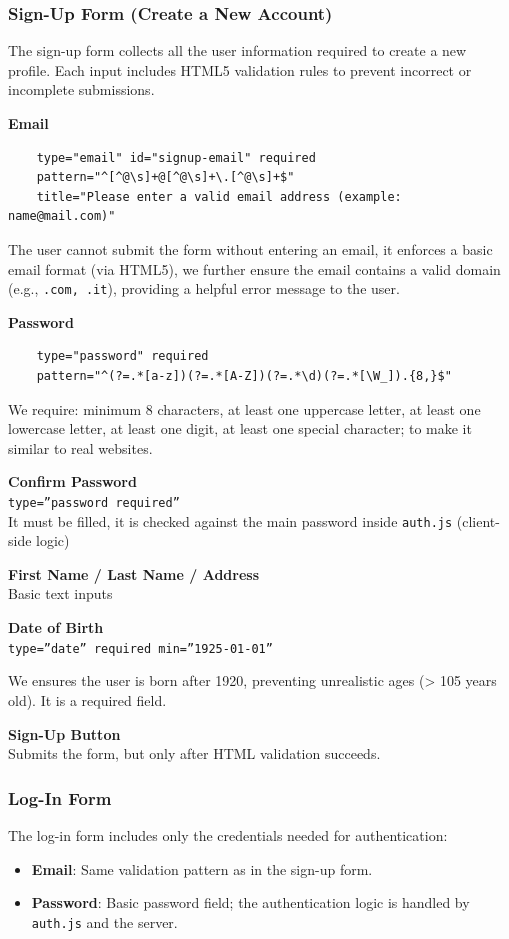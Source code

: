 \documentclass[11pt,a4paper]{report}
\begin{document}
 \subsubsection{Sign-Up Form (Create a New Account)}
 The sign-up form collects all the user information required to create a new profile. Each input includes HTML5 validation rules to prevent incorrect or incomplete submissions.
 
\textbf{Email}
\begin{lstlisting}
    type="email" id="signup-email" required 
    pattern="^[^@\s]+@[^@\s]+\.[^@\s]+$" 
    title="Please enter a valid email address (example: name@mail.com)"
\end{lstlisting}

The user cannot submit the form without entering an email, it enforces a basic email format (via HTML5), we further ensure the email contains a valid domain (e.g., \texttt{.com, .it}), providing a helpful error message to the user.

\textbf{Password}
\begin{lstlisting}
    type="password"	required	
    pattern="^(?=.*[a-z])(?=.*[A-Z])(?=.*\d)(?=.*[\W_]).{8,}$"
\end{lstlisting}

We require: minimum 8 characters, at least one uppercase letter, at least one lowercase letter, at least one digit, at least one special character; to make it  similar to real websites.

\textbf{Confirm Password}\\
\texttt{type=''password  required''}\\
It must be filled, it is checked against the main password inside \texttt{auth.js} (client-side logic)

\textbf{First Name / Last Name / Address}\\
Basic text inputs 

\textbf{Date of Birth}\\
\texttt{type=''date''	required	 min=''1925-01-01''}

We ensures the user is born after 1920, preventing unrealistic ages (> 105 years old). It is a required field.


\textbf{Sign-Up Button}\\
Submits the form, but only after HTML validation succeeds.

\subsubsection{Log-In Form}
The log-in form includes only the credentials needed for authentication:
\begin{itemize}
    \item \textbf{Email}: Same validation pattern as in the sign-up form.
    \item \textbf{Password}: Basic password field; the authentication logic is handled by \texttt{auth.js} and the server.
\end{itemize}
\end{document}
